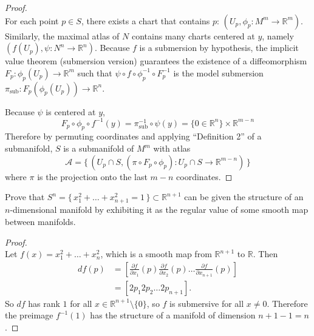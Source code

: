 \documentclass{article}
\newenvironment{problem}[2][Problem]{\begin{trivlist}
\item[\hskip \labelsep {\bfseries #1}\hskip \labelsep {\bfseries #2.}]}{\end{trivlist}}
\begin{document}
\begin{proof} \text{}\\
  For each point $p \in S$, there exists a chart that contains $p$:
    $(U_p, \phi_p: M^m \rightarrow \mathbb{R}^m)$.
  Similarly, the maximal atlas of $N$ contains many charts centered at $y$, namely
    $(f(U_p), \psi: N^n \rightarrow \mathbb{R}^n)$.
  Because $f$ is a submersion by hypothesis, the implicit value theorem
  (submersion version) guarantees the existence of a diffeomorphism
  $F_p: \phi_p(U_p) \rightarrow \mathbb{R}^m$ such that
  $\psi \circ f \circ \phi_p^{-1} \circ F_p^{-1}$ is the model submersion
  $\pi_\text{sub}: F_p(\phi_p(U_p)) \rightarrow \mathbb{R}^n$.

  Because $\psi$ is centered at $y$, \[
    F_p\circ\phi_p\circ f^{-1}(y) = \pi_\text{sub}^{-1} \circ \psi(y)
      = \{ 0 \in \mathbb{R}^n\} \times \mathbb{R}^{m - n}
  \]
  Therefore by permuting coordinates and applying ``Definition 2'' of a submanifold,
  $S$ is a submanifold of $M^m$ with atlas \[
    \mathcal{A} = \{\, (
      U_p \cap S,
      (\pi \circ F_p \circ \phi_p)\colon U_p \cap S \rightarrow \mathbb{R}^{m-n}
    ) \,\}
  \] where $\pi$ is the projection onto the last $m - n$ coordinates.
\end{proof}

\pagebreak

\begin{problem}{5}
  Prove that $S^n = \{\,x_1^2+\hdots+x_{n+1}^2=1\,\} \subset \mathbb{R}^{n+1}$
  can be given the structure of an $n$-dimensional manifold by exhibiting it as
  the regular value of some smooth map between manifolds.
\end{problem}

\begin{proof} \text{} \\
  Let $f(x) = x_1^2+\hdots+x_n^2$, which is a smooth map from $\mathbb{R}^{n+1}$
  to $\mathbb{R}$.
  Then \begin{align*}
    df(p) &= \left[
      \frac{\partial f}{\partial x_1}(p) \frac{\partial f}{\partial x_2}(p) \hdots
      \frac{\partial f}{\partial x_{n+1}}(p)
    \right] \\
    &= [2p_1 2p_2 \hdots 2p_{n+1}].
  \end{align*}
  So $df$ has rank $1$ for all $x \in \mathbb{R}^{n + 1} \setminus \{0\}$, so
  $f$ is submersive for all $x \not= 0$. Therefore the preimage $f^{-1}(1)$ has
  the structure of a manifold of dimension $n + 1 - 1 = n$.
\end{proof}
\end{document}
